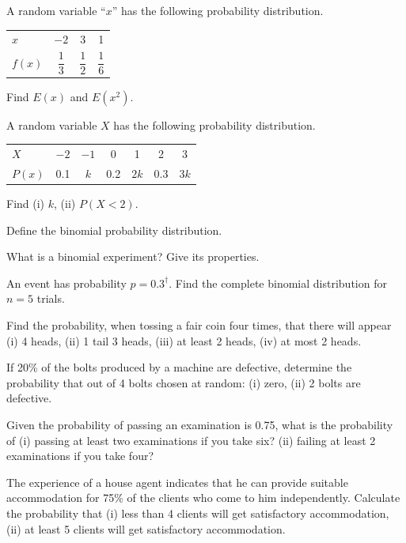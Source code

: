 \documentclass[11pt,a4paper]{article}
\begin{document}
\begin{longlist}
\item A random variable ``$x$'' has the following probability distribution.
\begin{center}
\begin{tabular}{l ccc}
\toprule
$x$ & $-2$ & 3 & 1 \\
$f(x)$ & $\dfrac{1}{3}$ & $\dfrac{1}{2}$ & $\dfrac{1}{6}$ \\
\bottomrule
\end{tabular}
\end{center}
Find $E(x)$ and $E(x^2)$.

\item A random variable $X$ has the following probability distribution.
\begin{center}
\begin{tabular}{l cccccc}
\toprule
$X$ & $-2$ & $-1$ & 0 & 1 & 2 & 3 \\
$P(x)$ & 0.1 & $k$ & 0.2 & $2k$ & 0.3 & $3k$ \\
\bottomrule
\end{tabular}
\end{center}
Find (i) $k$, (ii) $P(X<2)$.

\item Define the binomial probability distribution.

\item What is a binomial experiment? Give its properties.

\item An event has probability $p=0.3^\dagger$. Find the complete binomial distribution for $n=5$ trials.

\item Find the probability, when tossing a fair coin four times, that there will appear (i) 4 heads, (ii) 1 tail 3 heads, (iii) at least 2 heads, (iv) at most 2 heads.

\item If 20\% of the bolts produced by a machine are defective, determine the probability that out of 4 bolts chosen at random: (i) zero, (ii) 2 bolts are defective.

\item Given the probability of passing an examination is 0.75, what is the probability of (i) passing at least two examinations if you take six? (ii) failing at least 2 examinations if you take four?

\item The experience of a house agent indicates that he can provide suitable accommodation for 75\% of the clients who come to him independently. Calculate the probability that (i) less than 4 clients will get satisfactory accommodation, (ii) at least 5 clients will get satisfactory accommodation.


\end{longlist}
\end{document}
